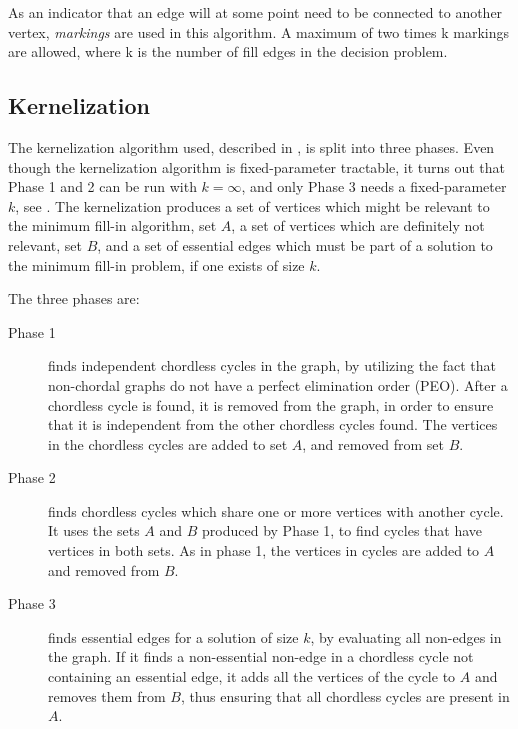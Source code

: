 \documentclass{article}
\begin{document}
	As an indicator that an edge will at some point need to be connected to another vertex, \emph{markings} are used in this algorithm. 
	A maximum of two times k markings are allowed, where k is the number of fill edges in the decision problem.

		\subsection{Kernelization}
		The kernelization algorithm used, described in \cite{kernel}, is split into three phases. Even though the kernelization algorithm is fixed-parameter tractable, it turns out that Phase 1 and 2 can be run with $k=\infty$, and only Phase 3 needs a fixed-parameter $k$, see \cite{polynomial-approx}. The kernelization produces a set of vertices which might be relevant to the minimum fill-in algorithm, set $A$, a set of vertices which are definitely not relevant, set $B$, and a set of essential edges which must be part of a solution to the minimum fill-in problem, if one exists of size $k$. 

		The three phases are:
		\begin{description}
			\item[Phase 1] finds independent chordless cycles in the graph, by utilizing the fact that non-chordal graphs do not have a perfect elimination order (PEO). After a chordless cycle is found, it is removed from the graph, in order to ensure that it is independent from the other chordless cycles found. The vertices in the chordless cycles are added to set $A$, and removed from set $B$.
			\item[Phase 2] finds chordless cycles which share one or more vertices with another cycle. It uses the sets $A$ and $B$ produced by Phase 1, to find cycles that have vertices in both sets. As in phase 1, the vertices in cycles are added to $A$ and removed from $B$.
			\item[Phase 3] finds essential edges for a solution of size $k$, by evaluating all non-edges in the graph. If it finds a non-essential non-edge in a chordless cycle not containing an essential edge, it adds all the vertices of the cycle to $A$ and removes them from $B$, thus ensuring that all chordless cycles are present in $A$.
		\end{description}
\end{document}

